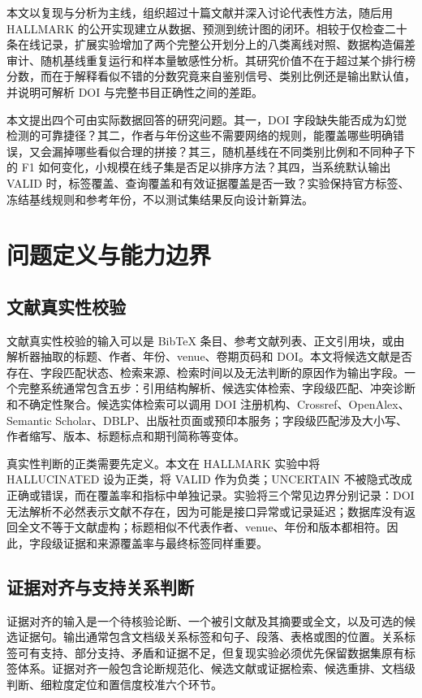 \documentclass[UTF8,a4paper,11pt]{ctexart}
\begin{document}
本文以复现与分析为主线，组织超过十篇文献并深入讨论代表性方法，随后用 HALLMARK 的公开实现建立从数据、预测到统计图的闭环。相较于仅检查二十条在线记录，扩展实验增加了两个完整公开划分上的八类离线对照、数据构造偏差审计、随机基线重复运行和样本量敏感性分析。其研究价值不在于超过某个排行榜分数，而在于解释看似不错的分数究竟来自鉴别信号、类别比例还是输出默认值，并说明可解析 DOI 与完整书目正确性之间的差距。

本文提出四个可由实际数据回答的研究问题。其一，DOI 字段缺失能否成为幻觉检测的可靠捷径？其二，作者与年份这些不需要网络的规则，能覆盖哪些明确错误，又会漏掉哪些看似合理的拼接？其三，随机基线在不同类别比例和不同种子下的 F1 如何变化，小规模在线子集是否足以排序方法？其四，当系统默认输出 VALID 时，标签覆盖、查询覆盖和有效证据覆盖是否一致？实验保持官方标签、冻结基线规则和参考年份，不以测试集结果反向设计新算法。

\section{问题定义与能力边界}

\subsection{文献真实性校验}

文献真实性校验的输入可以是 BibTeX 条目、参考文献列表、正文引用块，或由解析器抽取的标题、作者、年份、venue、卷期页码和 DOI。本文将候选文献是否存在、字段匹配状态、检索来源、检索时间以及无法判断的原因作为输出字段。一个完整系统通常包含五步：引用结构解析、候选实体检索、字段级匹配、冲突诊断和不确定性聚合。候选实体检索可以调用 DOI 注册机构、Crossref、OpenAlex、Semantic Scholar、DBLP、出版社页面或预印本服务；字段级匹配涉及大小写、作者缩写、版本、标题标点和期刊简称等变体。

真实性判断的正类需要先定义。本文在 HALLMARK 实验中将 HALLUCINATED 设为正类，将 VALID 作为负类；UNCERTAIN 不被隐式改成正确或错误，而在覆盖率和指标中单独记录。实验将三个常见边界分别记录：DOI 无法解析不必然表示文献不存在，因为可能是接口异常或记录延迟；数据库没有返回全文不等于文献虚构；标题相似不代表作者、venue、年份和版本都相符。因此，字段级证据和来源覆盖率与最终标签同样重要。

\subsection{证据对齐与支持关系判断}

证据对齐的输入是一个待核验论断、一个被引文献及其摘要或全文，以及可选的候选证据句。输出通常包含文档级关系标签和句子、段落、表格或图的位置。关系标签可有支持、部分支持、矛盾和证据不足，但复现实验必须优先保留数据集原有标签体系。证据对齐一般包含论断规范化、候选文献或证据检索、候选重排、文档级判断、细粒度定位和置信度校准六个环节。
\end{document}
